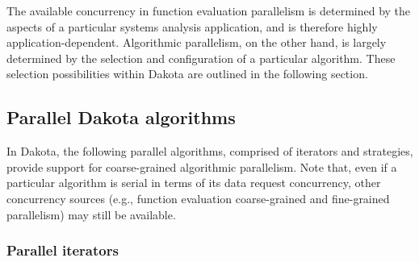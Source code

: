 The available concurrency in function evaluation parallelism is
determined by the aspects of a particular systems analysis
application, and is therefore highly application-dependent.
Algorithmic parallelism, on the other hand, is largely determined by
the selection and configuration of a particular algorithm.  These
selection possibilities within Dakota are outlined in the following
section.


\subsection{Parallel Dakota algorithms} \label{parallel:algorithms}

In Dakota, the following parallel algorithms, comprised of iterators
and strategies, provide support for coarse-grained algorithmic
parallelism.  Note that, even if a particular algorithm is serial in
terms of its data request concurrency, other concurrency sources
(e.g., function evaluation coarse-grained and fine-grained
parallelism) may still be available.

\subsubsection{Parallel iterators}\label{parallel:algorithms:iterators}

